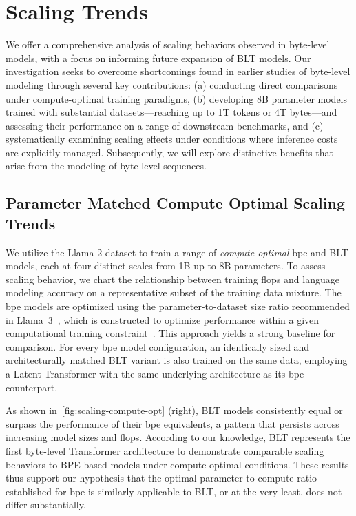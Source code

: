 \section{Scaling Trends}
\label{section:scaling}

We offer a comprehensive analysis of scaling behaviors observed in byte-level models, with a focus on informing future expansion of {\textsc BLT} models. Our investigation seeks to overcome shortcomings found in earlier studies of byte-level modeling through several key contributions: (a) conducting direct comparisons under compute-optimal training paradigms, (b) developing 8B parameter models trained with substantial datasets—reaching up to 1T tokens or 4T bytes—and assessing their performance on a range of downstream benchmarks, and (c) systematically examining scaling effects under conditions where inference costs are explicitly managed. Subsequently, we will explore distinctive benefits that arise from the modeling of byte-level sequences.

\subsection{Parameter Matched Compute Optimal Scaling Trends}
\label{section:parameter-matched-scaling}
We utilize the Llama 2 dataset to train a range of \textit{compute-optimal} bpe and {\textsc BLT} models, each at four distinct scales from 1B up to 8B parameters. To assess scaling behavior, we chart the relationship between training flops and language modeling accuracy on a representative subset of the training data mixture. The bpe models are optimized using the parameter-to-dataset size ratio recommended in Llama~3~\citep{dubey2024llama}, which is constructed to optimize performance within a given computational training constraint~\citep{hoffmann2022training}. This approach yields a strong baseline for comparison. For every bpe model configuration, an identically sized and architecturally matched {\textsc BLT} variant is also trained on the same data, employing a Latent Transformer with the same underlying architecture as its bpe counterpart.

As shown in~\autoref{fig:scaling-compute-opt} (right), {\textsc BLT} models consistently equal or surpass the performance of their bpe equivalents, a pattern that persists across increasing model sizes and flops. According to our knowledge, {\textsc BLT} represents the first byte-level Transformer architecture to demonstrate comparable scaling behaviors to BPE-based models under compute-optimal conditions. These results thus support our hypothesis that the optimal parameter-to-compute ratio established for bpe is similarly applicable to {\textsc BLT}, or at the very least, does not differ substantially.

